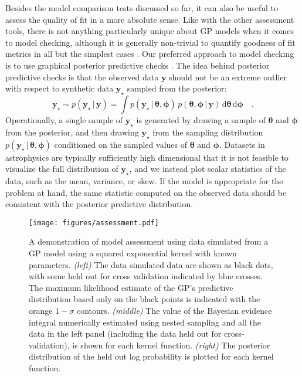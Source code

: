 \documentclass[letterpaper]{ar-1col}
\newcommand{\ydata}{\ensuremath{\boldsymbol{y}}}
\newcommand{\hyperparams}{\ensuremath{\boldsymbol{\phi}}}
\newcommand{\meanparams}{\ensuremath{\boldsymbol{\theta}}}
\begin{document}
Besides the model comparison tests discussed so far, it can also be useful to assess the quality of fit in a more absolute sense.
Like with the other assessment tools, there is not anything particularly unique about GP models when it comes to model checking, although it is generally non-trivial to quantify goodness of fit metrics in all but the simplest cases \citep[e.g.,][]{gelman1995bayesian}.
Our preferred approach to model checking is to use graphical posterior predictive checks \citep[see][for example]{bayes-workflow}.
The idea behind posterior predictive checks is that the observed data $\ydata$ should not be an extreme outlier with respect to synthetic data $\ydata_\star$ sampled from the posterior:
\begin{equation}
  \ydata_\star \sim p(\ydata_\star\,|\,\ydata) = \int p(\ydata_\star\,|\,\meanparams,\hyperparams)\,p(\meanparams,\hyperparams\,|\,\ydata)\,\mathrm{d}\meanparams\,\mathrm{d}\hyperparams \quad.
\end{equation}
Operationally, a single sample of $\ydata_\star$ is generated by drawing a sample of $\meanparams$ and $\hyperparams$ from the posterior, and then drawing $\ydata_\star$ from the sampling distribution $p(\ydata_\star\,|\,\meanparams,\hyperparams)$ conditioned on the sampled values of $\meanparams$ and $\hyperparams$.
Datasets in astrophysics are typically sufficiently high dimensional that it is not feasible to visualize the full distribution of $\ydata_\star$, and we instead plot scalar statistics of the data, such as the mean, variance, or skew.
If the model is appropriate for the problem at hand, the same statistic computed on the observed data should be consistent with the posterior predictive distribution.

\begin{figure}[ht]
  \centering
  \texttt{[image: figures/assessment.pdf]}
  \caption{A demonstration of model assessment using data simulated from a GP model using a squared exponential kernel with known parameters.
  \emph{(left)} The data simulated data are shown as black dots, with some held out for cross validation indicated by blue crosses.
  The maximum likelihood estimate of the GP's predictive distribution based only on the black points is indicated with the orange $1-\sigma$ contours.
  \emph{(middle)} The value of the Bayesian evidence integral numerically estimated using nested sampling and all the data in the left panel (including the data held out for cross-validation), is shown for each kernel function.
  \emph{(right)} The posterior distribution of the held out log probability is plotted for each kernel function.}
  \label{fig:assessment}
\end{figure}
\end{document}
